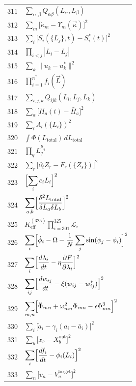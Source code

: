 \documentclass[12pt,a4paper]{article}
\begin{document}
\begin{longtable}{r p{}}
		311 & \(\displaystyle \sum_{\alpha,\beta}Q_{\alpha\beta}(L_\alpha,L_\beta)\) \\
		312 & \(\displaystyle \sum_m\bigl[\dot\kappa_m - \Upsilon_m(\vec\kappa)\bigr]^2\) \\
		313 & \(\displaystyle \sum_i\bigl[S_i(\{L_j\},t) - S_i^*(t)\bigr]^2\) \\
		314 & \(\displaystyle \prod_{i<j}|L_i - L_j|\) \\
		315 & \(\displaystyle \sum_k\|u_k - u_k^*\|^2\) \\
		316 & \(\displaystyle \prod_{i=1}^{n^*}f_i(\vec L)\) \\
		317 & \(\displaystyle \sum_{i,j,k}Q_{ijk}(L_i,L_j,L_k)\) \\
		318 & \(\displaystyle \sum_a\bigl[H_a(t) - \bar H_a\bigr]^2\) \\
		319 & \(\displaystyle \sum_l A_l(\{L_i\})^2\) \\
		320 & \(\displaystyle \int\Phi(L_{\text{total}})\,dL_{\text{total}}\) \\
		321 & \(\displaystyle \prod_q L_q^{\mu_q}\) \\
		322 & \(\displaystyle \sum_r\bigl[\partial_t Z_r - F_r(\{Z_s\})\bigr]^2\) \\
		323 & \(\displaystyle \Bigl[\sum_i c_i L_i\Bigr]^2\) \\
		324 & \(\displaystyle \sum_{a,b}\Bigl[\frac{\delta^2 L_{\text{total}}}{\delta L_a\delta L_b}\Bigr]^2\) \\
		325 & \(\displaystyle K^{(325)}_{\mathrm{eff}}\prod_{i=301}^{325}\mathcal{L}_i\) \\
		326 & \(\displaystyle \sum_i\Bigl[\dot\phi_i - \Omega - \frac1N\sum_j\sin(\phi_j-\phi_i)\Bigr]^2\) \\
		327 & \(\displaystyle \sum_i\Bigl[\frac{d\lambda_i}{dt} - \eta\frac{\partial F}{\partial\lambda_i}\Bigr]^2\) \\
		328 & \(\displaystyle \sum_{ij}\Bigl[\frac{dw_{ij}}{dt} - \xi(w_{ij}-w_{ij}^*)\Bigr]^2\) \\
		329 & \(\displaystyle \sum_{m,n}\Bigl[\ddot\Phi_{mn} + \omega_{mn}^2\Phi_{mn} - \epsilon\Phi_{mn}^3\Bigr]^2\) \\
		330 & \(\displaystyle \sum_i\bigl[\dot a_i - \gamma_i(a_i - \bar a_i)\bigr]^2\) \\
		331 & \(\displaystyle \sum_b\bigl[x_b - X_b^{\text{opt}}\bigr]^2\) \\
		332 & \(\displaystyle \sum_i\Bigl[\frac{df_i}{dt} - \phi_i(L_i)\Bigr]^2\) \\
		333 & \(\displaystyle \sum_n\bigl[v_n - V_n^{\text{target}}\bigr]^2\) \\

\end{longtable}
\end{document}
